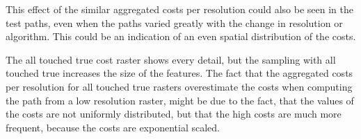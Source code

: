 This effect of the similar aggregated costs per resolution could also be seen in the test paths, even when the paths varied greatly with the change in resolution or algorithm.
This could be an indication of an even spatial distribution of the costs.

The all touched true cost raster shows every detail, but the sampling with all touched true increases the size of the features.
The fact that the aggregated costs per resolution for all touched true rasters overestimate the costs when computing the path from a low resolution raster, might be due to the fact, that the values of the costs are not uniformly distributed, but that the high costs are much more frequent, because the costs are exponential scaled.

